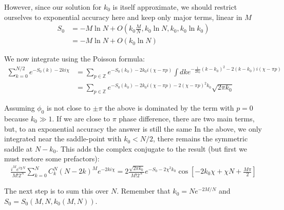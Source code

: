 However, since our solution for $k_{0}$ is itself approximate, we
should restrict ourselves to exponential accuracy here and keep only
major terms, linear in $M$
\begin{align*}
\label{mixed_refl_action}
S_{0} & =-M\ln N+O(k_{0}\frac{M}{N},k_{0}\ln N,k_{0},k_{0}\ln k_{0})\\
& =-M\ln N+O(k_{0}\ln N)
\end{align*}

We now integrate using the Poisson formula:
\begin{align*}
\sum_{k=0}^{N/2}e^{-S_{0}(k)-2ki\chi} & =\sum_{p\in\mathbb{Z}}e^{-S_{0}(k_{0})-2k_{0}i(\chi-\pi p)}\int dke^{-\frac{1}{2k_{0}}(k-k_{0})^{2}-2(k-k_{0})i(\chi-\pi p)}\\
& =\sum_{p\in\mathbb{Z}}e^{-S_{0}(k_{0})-2k_{0}i(\chi-\pi p)-2(\chi-\pi p)^{2}k_{0}}\sqrt{2\pi k_{0}}
\end{align*}

Assuming $\phi_{0}$ is not close to $\pm\pi$ the above is dominated
by the term with $p=0$ because $k_{0}\gg1$. If we are close to $\pi$
phase difference, there are two main terms, but, to an exponential
accuracy the answer is still the same 
In the above, we only integrated near the saddle-point with $k_{0}<N/2$,
there remains the symmetric saddle at $N-k_{0}$. This adds the complex
conjugate to the result (but first we must restore some prefactors):
\begin{gather}
\frac{i^{M}e^{i\chi N}}{M!2^{N}}\sum_{k=0}^{N}C_{k}^{N}(N-2k)^{M}e^{-2ki\chi}
=
2\frac{\sqrt{2\pi k_{0}}}{M!2^{N}}
e^{-S_{0}-2\chi^{2}k_{0}}
\cos\left[-2k_{0}\chi+\chi N+\frac{M\pi}{2}\right]
\end{gather}

The next step is to sum this over $N$. Remember that $k_{0}=Ne^{-2M/N}$
and $S_{0}=S_{0}(M,N,k_{0}(M,N))$. 

